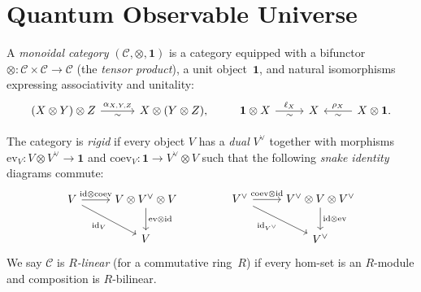 \chapter{Quantum Observable Universe}
\label{chap:qou}


\begin{definition}
\label{def:rigid-monoidal-category}
A \emph{monoidal category} $(\mathcal{C}, \otimes, \mathbf{1})$ is a
category equipped with a bifunctor
$\otimes \colon \mathcal{C} \times \mathcal{C} \to \mathcal{C}$ (the
\emph{tensor product}), a unit object~$\mathbf{1}$, and natural
isomorphisms expressing associativity and unitality:
\[
\begin{tikzcd}[column sep=3em]
  (X \otimes Y) \otimes Z
    \ar[r, "\alpha_{X,Y,Z}", "\sim"']
  & X \otimes (Y \otimes Z),
\end{tikzcd}
\qquad
\begin{tikzcd}[column sep=2.5em]
  \mathbf{1} \otimes X
    \ar[r, "\ell_X", "\sim"']
  & X
  & X \otimes \mathbf{1}.
    \ar[l, "\rho_X"', "\sim"]
\end{tikzcd}
\]

The category is \emph{rigid} if every object $V$ has a \emph{dual}
$V^{\vee}$ together with morphisms
$\mathrm{ev}_V \colon V \otimes V^{\vee} \to \mathbf{1}$
and
$\mathrm{coev}_V \colon \mathbf{1} \to V^{\vee} \otimes V$
such that the following \emph{snake identity} diagrams commute:
\begin{equation}\label{eq:snake-identities}
\begin{tikzcd}[row sep=2em, column sep=2.5em]
  V
    \ar[r, "\mathrm{id} \otimes \mathrm{coev}"]
    \ar[dr, "\mathrm{id}_V"']
  & V \otimes V^{\vee} \otimes V
    \ar[d, "\mathrm{ev} \otimes \mathrm{id}"]
  \\
  & V
\end{tikzcd}
\qquad\qquad
\begin{tikzcd}[row sep=2em, column sep=2.5em]
  V^{\vee}
    \ar[r, "\mathrm{coev} \otimes \mathrm{id}"]
    \ar[dr, "\mathrm{id}_{V^{\vee}}"']
  & V^{\vee} \otimes V \otimes V^{\vee}
    \ar[d, "\mathrm{id} \otimes \mathrm{ev}"]
  \\
  & V^{\vee}
\end{tikzcd}
\end{equation}
We say $\mathcal{C}$ is \emph{$R$-linear} (for a commutative ring~$R$)
if every hom-set is an $R$-module and composition is $R$-bilinear.
\end{definition}

